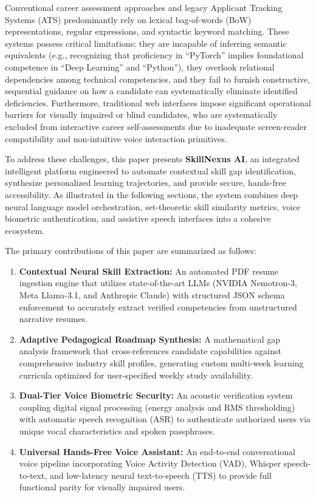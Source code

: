 \documentclass[conference]{IEEEtran}
\begin{document}
Conventional career assessment approaches and legacy Applicant Tracking Systems (ATS) predominantly rely on lexical bag-of-words (BoW) representations, regular expressions, and syntactic keyword matching. These systems possess critical limitations: they are incapable of inferring semantic equivalents (e.g., recognizing that proficiency in ``PyTorch'' implies foundational competence in ``Deep Learning'' and ``Python''), they overlook relational dependencies among technical competencies, and they fail to furnish constructive, sequential guidance on how a candidate can systematically eliminate identified deficiencies. Furthermore, traditional web interfaces impose significant operational barriers for visually impaired or blind candidates, who are systematically excluded from interactive career self-assessments due to inadequate screen-reader compatibility and non-intuitive voice interaction primitives.

To address these challenges, this paper presents \textbf{SkillNexus AI}, an integrated intelligent platform engineered to automate contextual skill gap identification, synthesize personalized learning trajectories, and provide secure, hands-free accessibility. As illustrated in the following sections, the system combines deep neural language model orchestration, set-theoretic skill similarity metrics, voice biometric authentication, and assistive speech interfaces into a cohesive ecosystem.

The primary contributions of this paper are summarized as follows:
\begin{enumerate}
    \item \textbf{Contextual Neural Skill Extraction:} An automated PDF resume ingestion engine that utilizes state-of-the-art LLMs (NVIDIA Nemotron-3, Meta Llama-3.1, and Anthropic Claude) with structured JSON schema enforcement to accurately extract verified competencies from unstructured narrative resumes.
    \item \textbf{Adaptive Pedagogical Roadmap Synthesis:} A mathematical gap analysis framework that cross-references candidate capabilities against comprehensive industry skill profiles, generating custom multi-week learning curricula optimized for user-specified weekly study availability.
    \item \textbf{Dual-Tier Voice Biometric Security:} An acoustic verification system coupling digital signal processing (energy analysis and RMS thresholding) with automatic speech recognition (ASR) to authenticate authorized users via unique vocal characteristics and spoken passphrases.
    \item \textbf{Universal Hands-Free Voice Assistant:} An end-to-end conversational voice pipeline incorporating Voice Activity Detection (VAD), Whisper speech-to-text, and low-latency neural text-to-speech (TTS) to provide full functional parity for visually impaired users.
\end{enumerate}
\end{document}
